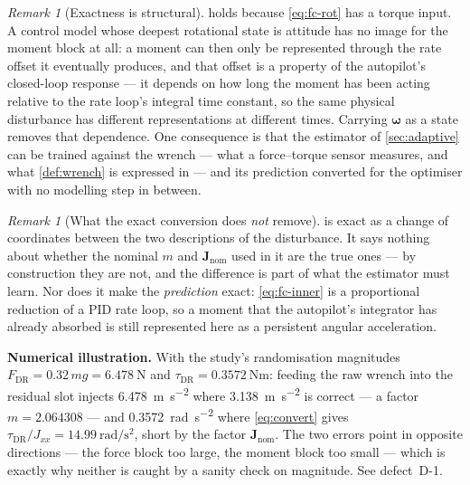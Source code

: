 \documentclass[11pt,a4paper,twoside,openright]{report}
\newcommand{\vMass}{2.064308}            %
\renewcommand{\vec}[1]{\bm{#1}}
\newcommand{\mat}[1]{\bm{#1}}
\newcommand{\bodyrate}{\vec{\omega}}
\theoremstyle{plain}
\theoremstyle{definition}
\theoremstyle{remark}
\newtheorem{remark}[theorem]{Remark}
\DeclareRobustCommand{\nbd}{\mbox{-}}
\begin{document}
	\begin{remark}[Exactness is structural]
		\label{rem:exactness}
		 holds because \cref{eq:fc-rot} has a torque input. A control
		model whose deepest rotational state is attitude has no image for the moment
		block at all: a moment can then only be represented through the rate offset it
		eventually produces, and that offset is a property of the autopilot's
		closed-loop response --- it depends on how long the moment has been acting
		relative to the rate loop's integral time constant, so the same physical
		disturbance has different representations at different times. Carrying
		$\bodyrate$ as a state removes that dependence. One consequence is that the
		estimator of \cref{sec:adaptive} can be trained against the wrench --- what a
		force--torque sensor measures, and what \cref{def:wrench} is expressed in ---
		and its prediction converted for the optimiser with no modelling step in
		between.
	\end{remark}

	\begin{remark}[What the exact conversion does \emph{not} remove]
		 is exact as a change of coordinates between the two
		descriptions of the disturbance. It says nothing about whether the nominal
		$m$ and $\mat J_\mathrm{nom}$ used in it are the true ones --- by construction
		they are not, and the difference is part of what the estimator must learn. Nor
		does it make the \emph{prediction} exact: \cref{eq:fc-inner} is a proportional
		reduction of a PID rate loop, so a moment that the autopilot's integrator has
		already absorbed is still represented here as a persistent angular
		acceleration.
	\end{remark}

	\begin{cautionbox}
		\textbf{Numerical illustration.} With the study's randomisation magnitudes
		$F_\mathrm{DR}=0.32\,mg=\SI{6.478}{\newton}$ and
		$\tau_\mathrm{DR}=\SI{0.3572}{\newton\metre}$: feeding the raw wrench into the
		residual slot injects \SI{6.478}{\metre\per\square\second} where
		\SI{3.138}{\metre\per\square\second} is correct --- a factor $m=\vMass$ --- and
		\SI{0.3572}{\radian\per\square\second} where \cref{eq:convert} gives
		$\tau_\mathrm{DR}/J_{xx}=\SI{14.99}{\radian\per\square\second}$, short by the
		factor $\mat J_\mathrm{nom}$. The two errors point in opposite directions ---
		the force block too large, the moment block too small --- which is exactly why
		neither is caught by a sanity check on magnitude. See defect~D\nbd 1.
	\end{cautionbox}
\end{document}
